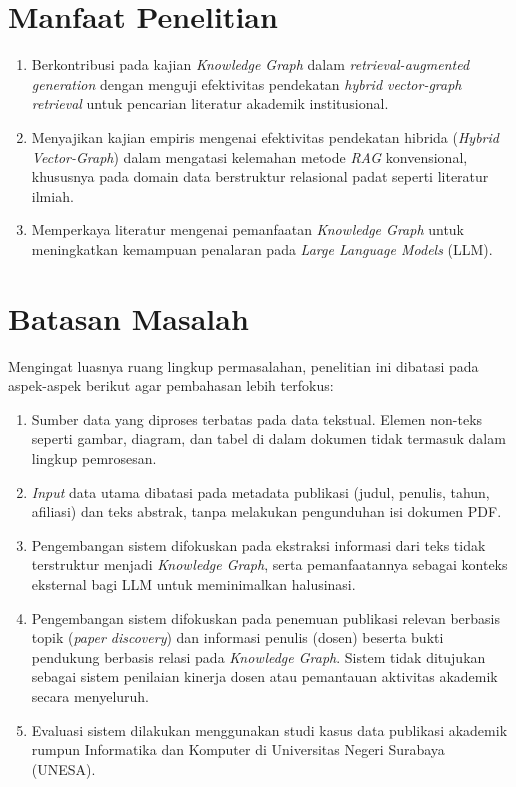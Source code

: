 \section{Manfaat Penelitian}

\begin{enumerate}[label=\arabic*., leftmargin=0.75cm]
    \item Berkontribusi pada kajian \textit{Knowledge Graph} dalam \textit{retrieval-augmented generation} dengan menguji efektivitas pendekatan \textit{hybrid vector-graph retrieval} untuk pencarian literatur akademik institusional.

    \item Menyajikan kajian empiris mengenai efektivitas pendekatan hibrida (\textit{Hybrid Vector-Graph}) dalam mengatasi kelemahan metode \textit{RAG} konvensional, khususnya pada domain data berstruktur relasional padat seperti literatur ilmiah.

    \item Memperkaya literatur mengenai pemanfaatan \textit{Knowledge Graph} untuk meningkatkan kemampuan penalaran pada \textit{Large Language Models} (LLM).
\end{enumerate}

\section{Batasan Masalah}

Mengingat luasnya ruang lingkup permasalahan, penelitian ini dibatasi pada aspek-aspek berikut agar pembahasan lebih terfokus:

\begin{enumerate}[label=\arabic*., leftmargin=0.75cm]
    \item Sumber data yang diproses terbatas pada data tekstual. Elemen non-teks seperti gambar, diagram, dan tabel di dalam dokumen tidak termasuk dalam lingkup pemrosesan.

    \item \textit{Input} data utama dibatasi pada metadata publikasi (judul, penulis, tahun, afiliasi) dan teks abstrak, tanpa melakukan pengunduhan isi dokumen PDF.

    \item Pengembangan sistem difokuskan pada ekstraksi informasi dari teks tidak terstruktur menjadi \textit{Knowledge Graph}, serta pemanfaatannya sebagai konteks eksternal bagi LLM untuk meminimalkan halusinasi.

    \item Pengembangan sistem difokuskan pada penemuan publikasi relevan berbasis topik (\textit{paper discovery}) dan informasi penulis (dosen) beserta bukti pendukung berbasis relasi pada \textit{Knowledge Graph}. Sistem tidak ditujukan sebagai sistem penilaian kinerja dosen atau pemantauan aktivitas akademik secara menyeluruh.

    \item Evaluasi sistem dilakukan menggunakan studi kasus data publikasi akademik rumpun Informatika dan Komputer di Universitas Negeri Surabaya (UNESA).
\end{enumerate}
